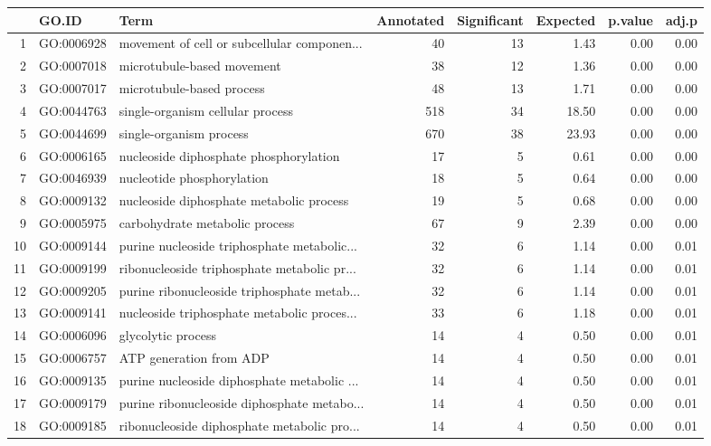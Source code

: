 \begin{table}[ht]
\centering
\begin{tabular}{rllrrrrr}
  \hline
 & GO.ID & Term & Annotated & Significant & Expected & p.value & adj.p \\ 
  \hline
1 & GO:0006928 & movement of cell or subcellular componen... &  40 &  13 & 1.43 & 0.00 & 0.00 \\ 
  2 & GO:0007018 & microtubule-based movement &  38 &  12 & 1.36 & 0.00 & 0.00 \\ 
  3 & GO:0007017 & microtubule-based process &  48 &  13 & 1.71 & 0.00 & 0.00 \\ 
  4 & GO:0044763 & single-organism cellular process & 518 &  34 & 18.50 & 0.00 & 0.00 \\ 
  5 & GO:0044699 & single-organism process & 670 &  38 & 23.93 & 0.00 & 0.00 \\ 
  6 & GO:0006165 & nucleoside diphosphate phosphorylation &  17 &   5 & 0.61 & 0.00 & 0.00 \\ 
  7 & GO:0046939 & nucleotide phosphorylation &  18 &   5 & 0.64 & 0.00 & 0.00 \\ 
  8 & GO:0009132 & nucleoside diphosphate metabolic process &  19 &   5 & 0.68 & 0.00 & 0.00 \\ 
  9 & GO:0005975 & carbohydrate metabolic process &  67 &   9 & 2.39 & 0.00 & 0.00 \\ 
  10 & GO:0009144 & purine nucleoside triphosphate metabolic... &  32 &   6 & 1.14 & 0.00 & 0.01 \\ 
  11 & GO:0009199 & ribonucleoside triphosphate metabolic pr... &  32 &   6 & 1.14 & 0.00 & 0.01 \\ 
  12 & GO:0009205 & purine ribonucleoside triphosphate metab... &  32 &   6 & 1.14 & 0.00 & 0.01 \\ 
  13 & GO:0009141 & nucleoside triphosphate metabolic proces... &  33 &   6 & 1.18 & 0.00 & 0.01 \\ 
  14 & GO:0006096 & glycolytic process &  14 &   4 & 0.50 & 0.00 & 0.01 \\ 
  15 & GO:0006757 & ATP generation from ADP &  14 &   4 & 0.50 & 0.00 & 0.01 \\ 
  16 & GO:0009135 & purine nucleoside diphosphate metabolic ... &  14 &   4 & 0.50 & 0.00 & 0.01 \\ 
  17 & GO:0009179 & purine ribonucleoside diphosphate metabo... &  14 &   4 & 0.50 & 0.00 & 0.01 \\ 
  18 & GO:0009185 & ribonucleoside diphosphate metabolic pro... &  14 &   4 & 0.50 & 0.00 & 0.01 \\ 

\end{tabular}
\end{table}
